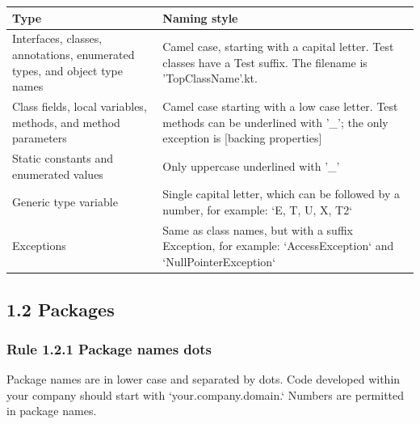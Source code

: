 \begin{center}

\begin{tabular}{ |p{7.5cm}|p{7.5cm}| }

\hline

Type&Naming style\\

\hline

 Interfaces, classes, annotations, enumerated types, and object type names & Camel case, starting with a capital letter. Test classes have a Test suffix. The filename is 'TopClassName'.kt.  \\

 Class fields, local variables, methods, and method parameters & Camel case starting with a low case letter. Test methods can be underlined with '\_'; the only exception is [backing properties]\\

 Static constants and enumerated values & Only uppercase underlined with '\_' \\

 Generic type variable & Single capital letter, which can be followed by a number, for example: `E, T, U, X, T2` \\

 Exceptions & Same as class names, but with a suffix Exception, for example: `AccessException` and `NullPointerException`\\

\hline

\end{tabular}

\end{center}

\subsection*{\textbf{1.2 Packages}}

\label{sec:1.2}



\subsubsection*{\textbf{Rule 1.2.1 Package names dots}}
\leavevmode\newline


Package names are in lower case and separated by dots. Code developed within your company should start with `your.company.domain.` Numbers are permitted in package names.


